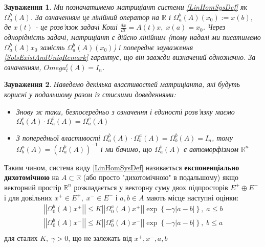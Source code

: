 \documentclass[14pt]{extarticle} %
\newcommand{\mynorm}[1]{\left|\left|#1\right|\right|}
\newcommand{\myabs}[1]{\left|#1\right|}
\newtheorem{remark}{Зауваження}
\begin{document}
\begin{remark}
	Ми позначатимемо матриціант системи \ref{LinHomSysDef} як $\Omega_a^b(A)$. За означенням це лінійний
	оператор на $\mathbb{R}$ і $\Omega_a^b(A)(x_0):=x(b)$, де $x(t)$ - це розв’язок задачі Коші $\frac{dx}{dt}=
	A(t)x,\;x(a)=x_0$. Через однорідність задачі, матриціант є дійсно лінійним (тому надалі ми
	писатимемо $\Omega_a^b(A)x_0$ замість $\Omega_a^b(A)(x_0)$) і попереднє зауваження \ref{SolsExistAndUniqRemark}
	гарантує, що він завжди визначений однозначно. За означенням, $Omega^t_t(A)=I_n$.
\end{remark}
\begin{remark}
Наведемо декілька властивостей матриціанта, які будуть корисні у подальшому разом із стислими доведеннями:
\begin{itemize}
	\item{Знову ж таки, безпосередньо з означення і єдиності розв’язку маємо $\Omega_b^c(A)\cdot\Omega_a^b(A)=\Omega_a^c(A)$}
	\item{З попередньої властивості $\Omega_a^b(A)\cdot\Omega_b^a(A)=\Omega_b^b(A)=I_n$, тому $\Omega_b^a(A)=\left(\Omega_a^b(A)\right)^{-1}$
		і ми бачимо, що $\Omega_a^b(A)$ є автоморфізмом $\mathbb{R}^n$}
\end{itemize}
\end{remark}

Таким чином, система виду \ref{LinHomSysDef} називається \textbf{експоненціально дихотомічною} на $A\subset\mathbb{R}$
(або просто "дихотомічною" в подальшому) якщо векторний простір $\mathbb{R}^n$ розкладається
у векторну суму двох підпросторів $E^+\oplus E^-$ і для довільних $x^+\in E^+,\; x^-\in E^-$ і $a,b\in A$ мають місце наступні оцінки:
\begin{equation}\begin{aligned}\label{DichotomyDef}
	\mynorm{\Omega^b_0(A)x^+}\leq K\mynorm{\Omega_0^a(A)x^+}\exp\left\{-\gamma\myabs{a-b}\right\},\;a\leq b\\
	\mynorm{\Omega^b_0(A)x^-}\leq K\mynorm{\Omega_0^a(A)x^-}\exp\left\{-\gamma\myabs{a-b}\right\},\;b\leq a\\
\end{aligned}\end{equation}
для сталих $K,\;\gamma>0$, що не залежать від $x^+,x^-,a,b$
\end{document}
